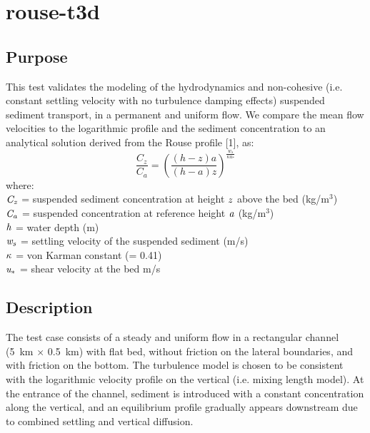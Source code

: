 \chapter{rouse-t3d}
%
%
\section{Purpose}
%
This test validates the modeling of the hydrodynamics and non-cohesive
(i.e. constant settling velocity with no turbulence damping effects)
suspended sediment transport, in a permanent and uniform flow. We
compare the mean flow velocities to the logarithmic profile and the
sediment concentration to an analytical solution derived from the Rouse
profile [1], as:
%
\begin{equation}\label{equation:RouseEqu}
\frac{C_z}{C_a}=\left(\frac{(h-z)a}{(h-a)z}\right)^{\frac{w_s}{\kappa u_*}}
\end{equation}
where:\\
$\it{C_z}$ = suspended sediment concentration at height $\it{z}$ above the bed (kg/m$^3$)\\
$\it{C_a}$ = suspended concentration at reference height $\it{a}$ (kg/m$^3$)\\
$\it{h}$ = water depth (m)\\
$\it{w_s}$ = settling velocity of the suspended sediment (m/s)\\
$\it{\kappa}$ = von Karman constant (= 0.41)\\
$\it{u_*}$ = shear velocity at the bed {m/s}


\section{Description}
%
The test case consists of a steady and uniform flow in a rectangular
channel (5~km $\times$ 0.5~km) with flat bed, without friction on the
lateral boundaries, and with friction on the bottom.
The turbulence model is chosen to be consistent with the logarithmic
velocity profile on the vertical (i.e. mixing length model).
At the entrance of the channel, sediment is introduced with a constant
concentration along the vertical, and an equilibrium profile gradually
appears downstream due to combined settling and vertical diffusion.
%
%
%

